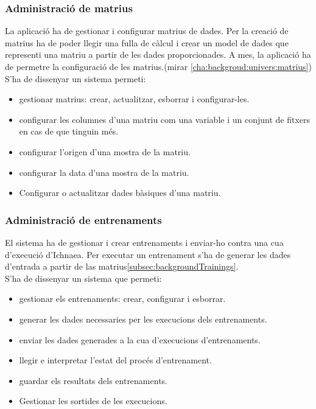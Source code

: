 \subsubsection{Administraci\'{o} de matrius}
La aplicaci\'{o} ha de gestionar i configurar matrius de dades. Per la creaci\'{o} de matrius ha de poder llegir una fulla de c\`{a}lcul i crear un model de dades que representi una matriu a partir de les dades proporcionades. A mes, la aplicaci\'{o} ha de permetre la configuraci\'{o} de les matrius.(mirar \ref{cha:backgroud:univers:matrius})\\

S'ha de dissenyar un sistema permeti:
\begin{itemize}
\item gestionar matrius: crear, actualitzar, esborrar i configurar-les.
\item configurar les columnes d'una matriu com una variable i un conjunt de fitxers en cas de que tinguin m\'{e}s.
\item configurar l'origen d'una mostra de la matriu.
\item configurar la data d'una mostra de la matriu.
\item Configurar o actualitzar dades b\`{a}siques d'una matriu.
\end{itemize}

\subsubsection{Administraci\'{o} de entrenaments}
El sistema ha de gestionar i crear entrenaments i enviar-ho contra una cua d'execuci\'{o} d'Ichnaea. Per executar un entrenament s'ha de generar les dades d'entrada a partir de las matrius\ref{subsec:backgroundTrainings}.\\

S'ha de dissenyar un sistema que permeti:
\begin{itemize}
	\item gestionar els entrenaments: crear, configurar i esborrar.
	\item generar les dades necessaries per les execucions dels entrenaments.
	\item enviar les dades generades a la cua d'execucions d'entrenaments.
	\item llegir e interpretar l'estat del proc\'{e}s d'entrenament.
	\item guardar els resultats dels entrenaments.
	\item Gestionar les sortides de les execucions.
\end{itemize}

